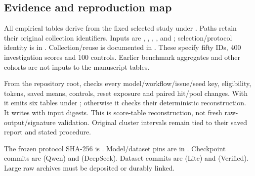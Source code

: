 \subsection{Evidence and reproduction map}\label{app:reproduction}
All empirical tables derive from the fixed selected study under . Paths retain their original collection identifiers. Inputs are , , , ,  and ; selection/protocol identity is in . Collection/reuse is documented in . These specify fifty IDs, 400 investigation scores and 100 controls. Earlier benchmark aggregates and other cohorts are not inputs to the manuscript tables.

From the repository root,  checks every model/workflow/issue/seed key, eligibility, tokens, saved means, controls, reset exposure and paired hit/pool changes. With  it emits six tables under ; otherwise it checks their deterministic reconstruction. It writes  with input digests. This is score-table reconstruction, not fresh raw-output/signature validation. Original cluster intervals remain tied to their saved report and stated procedure.

The frozen protocol SHA-256 is . Model/dataset pins are in . Checkpoint commits are  (Qwen) and  (DeepSeek). Dataset commits are  (Lite) and  (Verified). Large raw archives must be deposited or durably linked. 

